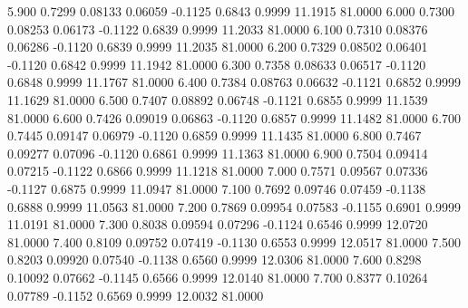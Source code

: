    5.900   0.7299   0.08133   0.06059  -0.1125   0.6843   0.9999  11.1915  81.0000
   6.000   0.7300   0.08253   0.06173  -0.1122   0.6839   0.9999  11.2033  81.0000
   6.100   0.7310   0.08376   0.06286  -0.1120   0.6839   0.9999  11.2035  81.0000
   6.200   0.7329   0.08502   0.06401  -0.1120   0.6842   0.9999  11.1942  81.0000
   6.300   0.7358   0.08633   0.06517  -0.1120   0.6848   0.9999  11.1767  81.0000
   6.400   0.7384   0.08763   0.06632  -0.1121   0.6852   0.9999  11.1629  81.0000
   6.500   0.7407   0.08892   0.06748  -0.1121   0.6855   0.9999  11.1539  81.0000
   6.600   0.7426   0.09019   0.06863  -0.1120   0.6857   0.9999  11.1482  81.0000
   6.700   0.7445   0.09147   0.06979  -0.1120   0.6859   0.9999  11.1435  81.0000
   6.800   0.7467   0.09277   0.07096  -0.1120   0.6861   0.9999  11.1363  81.0000
   6.900   0.7504   0.09414   0.07215  -0.1122   0.6866   0.9999  11.1218  81.0000
   7.000   0.7571   0.09567   0.07336  -0.1127   0.6875   0.9999  11.0947  81.0000
   7.100   0.7692   0.09746   0.07459  -0.1138   0.6888   0.9999  11.0563  81.0000
   7.200   0.7869   0.09954   0.07583  -0.1155   0.6901   0.9999  11.0191  81.0000
   7.300   0.8038   0.09594   0.07296  -0.1124   0.6546   0.9999  12.0720  81.0000
   7.400   0.8109   0.09752   0.07419  -0.1130   0.6553   0.9999  12.0517  81.0000
   7.500   0.8203   0.09920   0.07540  -0.1138   0.6560   0.9999  12.0306  81.0000
   7.600   0.8298   0.10092   0.07662  -0.1145   0.6566   0.9999  12.0140  81.0000
   7.700   0.8377   0.10264   0.07789  -0.1152   0.6569   0.9999  12.0032  81.0000
